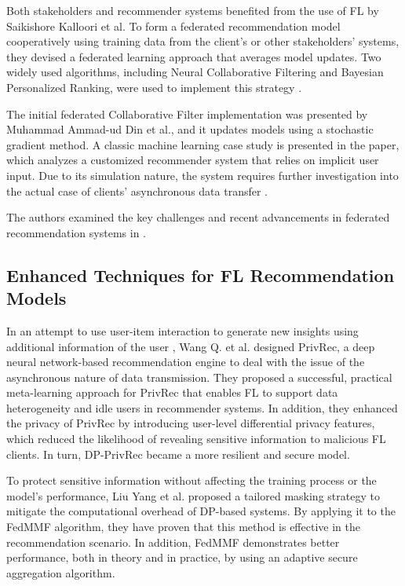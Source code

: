 Both stakeholders and recommender systems benefited from the use of FL by Saikishore Kalloori et al. To form a federated recommendation model cooperatively using training data from the client's or other stakeholders' systems, they devised a federated learning approach that averages model updates. Two widely used algorithms, including Neural Collaborative Filtering and Bayesian Personalized Ranking, were used to implement this strategy \cite{ref26}.

The initial federated Collaborative Filter implementation was presented by Muhammad Ammad-ud Din et al., and it updates models using a stochastic gradient method. A classic machine learning case study is presented in the paper, which analyzes a customized recommender system that relies on implicit user input. Due to its simulation nature, the system requires further investigation into the actual case of clients' asynchronous data transfer \cite{ref9}.

The authors examined the key challenges and recent advancements in federated recommendation systems in \cite{ref28}.

\subsection{Enhanced Techniques for FL Recommendation Models}
In an attempt to use user-item interaction to generate new insights using additional information of the user , Wang Q. et al. \cite{ref13} designed PrivRec, a deep neural network-based recommendation engine to deal with the issue of the asynchronous nature of data transmission. They proposed a successful, practical meta-learning approach for PrivRec that enables FL to support data heterogeneity and idle users in recommender systems. In addition, they enhanced the privacy of PrivRec by introducing user-level differential privacy features, which reduced the likelihood of revealing sensitive information to malicious FL clients. In turn, DP-PrivRec became a more resilient and secure model.

To protect sensitive information without affecting the training process or the model's performance, Liu Yang et al. proposed a tailored masking strategy to mitigate the computational overhead of DP-based systems. By applying it to the FedMMF algorithm, they have proven that this method is effective in the recommendation scenario. In addition, FedMMF demonstrates better performance, both in theory and in practice, by using an adaptive secure aggregation algorithm. \cite{ref30}

